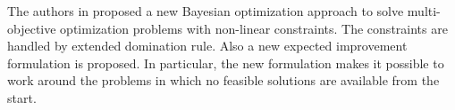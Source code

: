 \begin{longtable}{|p{6cm}|p{3cm}|p{2.5cm}|p{2cm}|}


\end{longtable}
The authors in \cite{feliot2017bayesian}  proposed a new Bayesian optimization approach to solve multi-objective optimization
problems with non-linear constraints. The constraints are handled by extended domination rule. Also a new expected improvement formulation is proposed. In particular, the new formulation makes it possible to work around the problems in which no feasible solutions are available from the start. 

